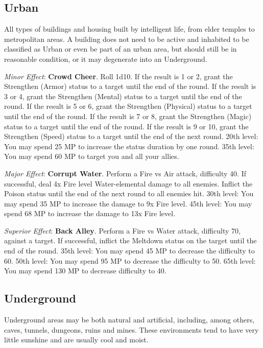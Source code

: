 \begin{multicols}{2}
\subsection*{Urban}\label{subsec:geo-urban}
All types of buildings and housing built by intelligent life, from elder temples to metropolitan areas. A building does not need to be active and inhabited to be classified as Urban or even be part of an urban area, but should still be in reasonable condition, or it may degenerate into an Underground.

\textit{Minor Effect}: \textbf{Crowd Cheer}. Roll 1d10. If the result is 1 or 2, grant the Strengthen (Armor) status to a target until the end of the round. If the result is 3 or 4, grant the Strengthen (Mental) status to a target until the end of the round. If the result is 5 or 6, grant the Strengthen (Physical) status to a target until the end of the round. If the result is 7 or 8, grant the Strengthen (Magic) status to a target until the end of the round. If the result is 9 or 10, grant the Strengthen (Speed) status to a target until the end of the next round. 20th level: You may spend 25 MP to increase the status duration by one round. 35th level: You may spend 60 MP to target you and all your allies.

\textit{Major Effect}: \textbf{Corrupt Water}. Perform a Fire vs Air attack, difficulty 40. If successful, deal 4x Fire level Water-elemental damage to all enemies. Inflict the Poison status until the end of the next round to all enemies hit. 30th level: You may spend 35 MP to increase the damage to 9x Fire level. 45th level: You may spend 68 MP to increase the damage to 13x Fire level.

\textit{Superior Effect}: \textbf{Back Alley}. Perform a Fire vs Water attack, difficulty 70, against a target. If successful, inflict the Meltdown status on the target until the end of the round. 35th level: You may spend 45 MP to decrease the difficulty to 60. 50th level: You may spend 95 MP to decrease the difficulty to 50. 65th level: You may spend 130 MP to decrease difficulty to 40.

\subsection*{Underground}\label{subsec:geo-underground}
Underground areas may be both natural and artificial, including, among others, caves, tunnels, dungeons, ruins and mines. These environments tend to have very little sunshine and are usually cool and moist.


\end{multicols}
